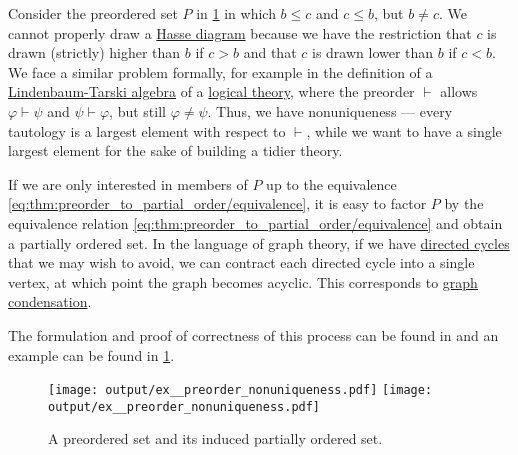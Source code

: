 \begin{example}\label{ex:preorder_nonuniqueness}
  Consider the preordered set \( P \) in \cref{fig:ex:preorder_nonuniqueness} in which \( b \leq c \) and \( c \leq b \), but \( b \neq c \). We cannot properly draw a \hyperref[def:hasse_diagram]{Hasse diagram} because we have the restriction that \( c \) is drawn (strictly) higher than \( b \) if \( c > b \) and that \( c \) is drawn lower than \( b \) if \( c < b \). We face a similar problem formally, for example in the definition of a \hyperref[def:lindenbaum_tarski_algebra]{Lindenbaum-Tarski algebra} of a \hyperref[def:first_order_theory]{logical theory}, where the preorder \( \vdash \) allows \( \varphi \vdash \psi \) and \( \psi \vdash \varphi \), but still \( \varphi \neq \psi \). Thus, we have nonuniqueness --- every tautology is a largest element with respect to \( \vdash \), while we want to have a single largest element for the sake of building a tidier theory.

  If we are only interested in members of \( P \) up to the equivalence \eqref{eq:thm:preorder_to_partial_order/equivalence}, it is easy to factor \( P \) by the equivalence relation \eqref{eq:thm:preorder_to_partial_order/equivalence} and obtain a partially ordered set. In the language of graph theory, if we have \hyperref[def:quiver_path/cycle]{directed cycles} that we may wish to avoid, we can contract each directed cycle into a single vertex, at which point the graph becomes acyclic. This corresponds to \hyperref[def:quiver_condensation]{graph condensation}.

  The formulation and proof of correctness of this process can be found in  and an example can be found in \cref{fig:ex:preorder_nonuniqueness}.

  \begin{figure}
    \hfill
    \texttt{[image: output/ex\_\_preorder\_nonuniqueness.pdf]}
    \hfill
    \texttt{[image: output/ex\_\_preorder\_nonuniqueness.pdf]}
    \hfill\hfill
    \caption{A preordered set and its induced partially ordered set.}
    \label{fig:ex:preorder_nonuniqueness}
  \end{figure}
\end{example}


